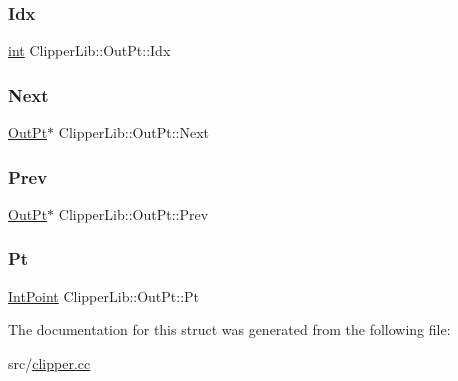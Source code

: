 \subsubsection{\texorpdfstring{Idx}{Idx}}
{\footnotesize\ttfamily \mbox{\hyperlink{draw_8hh_aa620a13339ac3a1177c86edc549fda9b}{int}} Clipper\+Lib\+::\+Out\+Pt\+::\+Idx}

\mbox{\label{struct_clipper_lib_1_1_out_pt_a2d605b87f6da37dbdbef990c4fa5819e}} 
\subsubsection{\texorpdfstring{Next}{Next}}
{\footnotesize\ttfamily \mbox{\hyperlink{struct_clipper_lib_1_1_out_pt}{Out\+Pt}}$\ast$ Clipper\+Lib\+::\+Out\+Pt\+::\+Next}

\mbox{\label{struct_clipper_lib_1_1_out_pt_a609eb414d5764e78150cceccaffc5d54}} 
\subsubsection{\texorpdfstring{Prev}{Prev}}
{\footnotesize\ttfamily \mbox{\hyperlink{struct_clipper_lib_1_1_out_pt}{Out\+Pt}}$\ast$ Clipper\+Lib\+::\+Out\+Pt\+::\+Prev}

\mbox{\label{struct_clipper_lib_1_1_out_pt_aa01c2b1e9c5b2d8faa40701178ffcf98}} 
\subsubsection{\texorpdfstring{Pt}{Pt}}
{\footnotesize\ttfamily \mbox{\hyperlink{struct_clipper_lib_1_1_int_point}{Int\+Point}} Clipper\+Lib\+::\+Out\+Pt\+::\+Pt}



The documentation for this struct was generated from the following file\+:\begin{DoxyCompactItemize}
\item 
src/\mbox{\hyperlink{clipper_8cc}{clipper.\+cc}}\end{DoxyCompactItemize}
